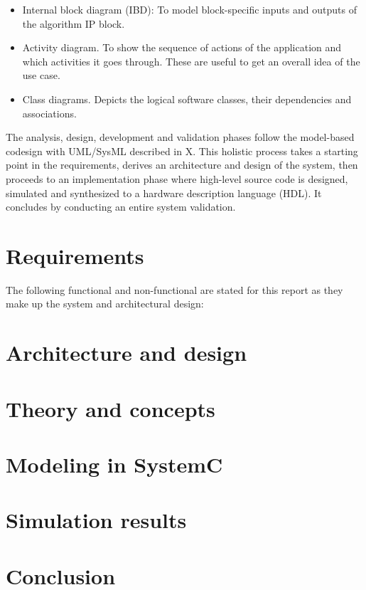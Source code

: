 \documentclass{article}
\begin{document}
\begin{itemize}
	\item Internal block diagram (IBD): To model block-specific inputs and outputs of the algorithm IP block.
	\item Activity diagram. To show the sequence of actions of the application and which activities it goes through. These are useful to get an overall idea of the use case.
	\item Class diagrams. Depicts the logical software classes, their dependencies and associations.
\end{itemize}

The analysis, design, development and validation phases follow the model-based codesign with UML/SysML described in X. This holistic process takes a starting point in the requirements, derives an architecture and design of the system, then proceeds to an implementation phase where high-level source code is designed, simulated and synthesized to a hardware description language (HDL). It concludes by conducting an entire system validation.

\section{Requirements}

The following functional and non-functional are stated for this report as they make up the system and architectural design:

\section{Architecture and design}




\section{Theory and concepts}
\section{Modeling in SystemC}
\section{Simulation results}
\section{Conclusion}

{}
\end{document}
